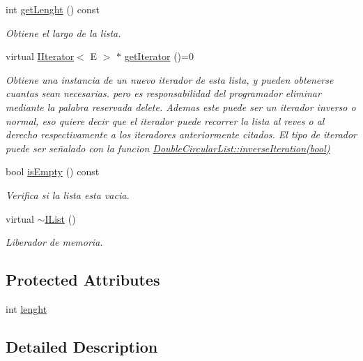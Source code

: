\begin{DoxyCompactItemize}
int \hyperlink{class_i_list_a6d43df225c304c3a0abdb4c7d81274b5}{get\-Lenght} () const 
\begin{DoxyCompactList}\small\item\em Obtiene el largo de la lista. \end{DoxyCompactList}\item 
virtual \hyperlink{class_i_iterator}{I\-Iterator}$<$ E $>$ $\ast$ \hyperlink{class_i_list_a997815664cc6b20eb5dfa9968251d2cd}{get\-Iterator} ()=0
\begin{DoxyCompactList}\small\item\em Obtiene una instancia de un nuevo iterador de esta lista, y pueden obtenerse cuantas sean necesarias. pero es responsabilidad del programador eliminar mediante la palabra reservada delete. Ademas este puede ser un iterador inverso o normal, eso quiere decir que el iterador puede recorrer la lista al reves o al derecho respectivamente a los iteradores anteriormente citados. El tipo de iterador puede ser señalado con la funcion \hyperlink{class_double_circular_list_a77212c5d6ad148c99a06009a8c44128b}{Double\-Circular\-List\-::inverse\-Iteration(bool)}\end{DoxyCompactList}\item 
bool \hyperlink{class_i_list_ad21f4969c574c87a4715d45496d81d5c}{is\-Empty} () const 
\begin{DoxyCompactList}\small\item\em Verifica si la lista esta vacia. \end{DoxyCompactList}\item 
virtual \hyperlink{class_i_list_a6ff12f7e891ea75a5554b70ed3fa0de8}{$\sim$\-I\-List} ()
\begin{DoxyCompactList}\small\item\em Liberador de memoria. \end{DoxyCompactList}\end{DoxyCompactItemize}
\subsection*{Protected Attributes}
\begin{DoxyCompactItemize}
\item 
int \hyperlink{class_i_list_a64ce981ba1104bbb482068983cb5a3bc}{lenght}
\end{DoxyCompactItemize}


\subsection{Detailed Description}

